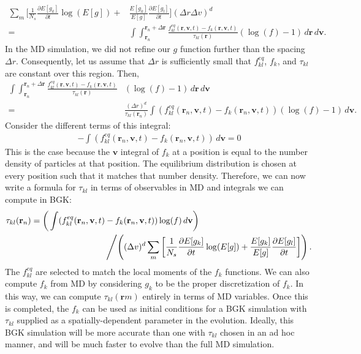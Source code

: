 \documentclass{article}
\begin{document}
\begin{align*}
\sum_m\bigg[\frac{1}{N_s}\frac{\partial E[g_k]}{\partial t}\log(E[g])+&\frac{E[g_k]}{E[g]}\frac{\partial E[g_l]}{\partial t}\bigg](\Delta r\Delta v)^d\\=&\int \int_{\mathbf{r}_n}^{\mathbf{r}_n+\Delta \mathbf{r}}\frac{f_{kl}^{eq}(\mathbf{r},\mathbf{v},t)-f_k(\mathbf{r},\mathbf{v},t)}{\tau_{kl}(\mathbf{r})}(\log(f)-1)\,d\mathbf{r}\,d\mathbf{v}.
\end{align*}In the MD simulation, we did not refine our $g$ function further than the spacing $\Delta r$. Consequently, let us assume that $\Delta r$ is sufficiently small that $f_{kl}^{eq}$, $f_k$, and $\tau_{kl}$ are constant over this region. Then,
\begin{align*}
\int \int_{\mathbf{r}_n}^{\mathbf{r}_n+\Delta \mathbf{r}}\frac{f_{kl}^{eq}(\mathbf{r},\mathbf{v},t)-f_k(\mathbf{r},\mathbf{v},t)}{\tau_{kl}(\mathbf{r})}&(\log(f)-1)\,d\mathbf{r}\,d\mathbf{v}\\=&\frac{(\Delta r)^d}{\tau_{kl}(\mathbf{r}_n)}\int(f_{kl}^{eq}(\mathbf{r}_n,\mathbf{v},t)-f_k(\mathbf{r}_n,\mathbf{v},t))(\log(f)-1)\,d\mathbf{v}.
\end{align*}Consider the different terms of this integral:
\begin{align*}
-\int (f_{kl}^{eq}(\mathbf{r}_n,\mathbf{v},t)-f_k(\mathbf{r}_n,\mathbf{v},t))\,d\mathbf{v}=0
\end{align*}This is the case because the $\mathbf{v}$ integral of $f_k$ at a position is equal to the number density of particles at that position. The equilibrium distribution is chosen at every position such that it matches that number density. Therefore, we can now write a formula for $\tau_{kl}$ in terms of observables in MD and integrals we can compute in BGK:
\begin{align}
\begin{split}
\tau_{kl}(\mathbf{r}_n)=\bigg(\int(f_{kl}^{eq}(\mathbf{r}_n,\mathbf{v},t)&-f_k(\mathbf{r}_n,\mathbf{v},t))\log(f)\,d\mathbf{v}\bigg)\\
&\left/\left((\Delta v)^d\sum_m\left[\frac{1}{N_s}\frac{\partial E[g_k]}{\partial t}\log(E[g])+\frac{E[g_k]}{E[g]}\frac{\partial E[g_l]}{\partial t}\right]\right).\right.
\end{split}
\end{align}The $f_{kl}^{eq}$ are selected to match the local moments of the $f_k$ functions. We can also compute $f_k$ from MD by considering $g_k$ to be the proper discretization of $f_k$. In this way, we can compute $\tau_{kl}(\mathbf{r}m)$ entirely in terms of MD variables. Once this is completed, the $f_k$ can be used as initial conditions for a BGK simulation with $\tau_{kl}$ supplied as a spatially-dependent parameter in the evolution. Ideally, this BGK simulation will be more accurate than one with $\tau_{kl}$ chosen in an ad hoc manner, and will be much faster to evolve than the full MD simulation. 
\end{document}
